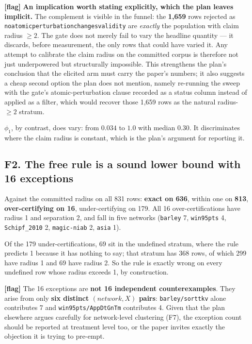 \documentclass[11pt,a4paper]{article}
\newcommand{\code}[1]{\texttt{\small\hspace{0pt}#1}}
\newcommand{\ul}{\discretionary{\_}{}{\_}}
\newcommand{\flag}{\textcolor{warn}{\textbf{[flag]}}}
\begin{document}
\flag{} \textbf{An implication worth stating explicitly, which the plan leaves implicit.} The
complement is visible in the funnel: the \textbf{1{,}659} rows rejected as
\code{no\ul atomic\ul perturbation\ul changes\ul validity} are \emph{exactly} the population with claim
radius $\geq 2$. The gate does not merely fail to vary the headline quantity --- it discards, before
measurement, the only rows that could have varied it. Any attempt to calibrate the claim radius on
the committed corpus is therefore not just underpowered but structurally impossible. This
strengthens the plan's conclusion that the elicited arm must carry the paper's numbers; it also
suggests a cheap second option the plan does not mention, namely re-running the sweep with the
gate's atomic-perturbation clause recorded as a status column instead of applied as a filter,
which would recover those 1{,}659 rows as the natural radius-$\geq 2$ stratum.

$\phi_1$, by contrast, does vary: from $0.034$ to $1.0$ with median $0.30$. It discriminates where
the claim radius is constant, which is the plan's argument for reporting it.

\subsection{F2. The free rule is a sound lower bound with 16 exceptions}

Against the committed radius on all 831 rows: \textbf{exact on 636}, within one on \textbf{813},
\textbf{over-certifying on 16}, under-certifying on 179. All 16 over-certifications have radius 1
and separation 2, and fall in five networks (\code{barley} 7, \code{win95pts} 4,
\code{Schipf\_2010} 2, \code{magic-niab} 2, \code{asia} 1).

Of the 179 under-certifications, 69 sit in the undefined stratum, where the rule predicts 1 because
it has nothing to say; that stratum has 368 rows, of which 299 have radius 1 and 69 have radius 2.
So the rule is exactly wrong on every undefined row whose radius exceeds 1, by construction.

\flag{} The 16 exceptions are \textbf{not 16 independent counterexamples}. They arise from only
\textbf{six distinct $(network, X)$ pairs}: \code{barley/sorttkv} alone contributes 7 and
\code{win95pts/AppDtGnTm} contributes 4. Given that the plan elsewhere argues carefully for
network-level clustering (F7), the exception count should be reported at treatment level too, or
the paper invites exactly the objection it is trying to pre-empt.
\end{document}
